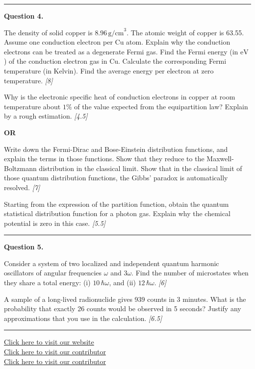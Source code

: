 \documentclass[11pt,a4paper]{article}
\newcommand{\pts}[1]{\hfill   \textit{[#1]}}
\begin{document}
\medskip\rule{\linewidth}{0.2pt}




\noindent   \textbf{Question 4.}

\begin{parts}
  \item The density of solid copper is $8.96\, \text{g/cm}^3$. The atomic weight of copper is 63.55. Assume one conduction electron per Cu atom. Explain why the conduction electrons can be treated as a degenerate Fermi gas. Find the Fermi energy (in $ \text{eV}$) of the conduction electron gas in Cu. Calculate the corresponding Fermi temperature (in Kelvin). Find the average energy per electron at zero temperature. \pts{8}
  \item Why is the electronic specific heat of conduction electrons in copper at room temperature about $1\%$ of the value expected from the equipartition law? Explain by a rough estimation. \pts{4.5}
\end{parts}
\hfill   \textbf{OR}

\begin{parts}
  \item Write down the Fermi-Dirac and Bose-Einstein distribution functions, and explain the terms in those functions. Show that they reduce to the Maxwell-Boltzmann distribution in the classical limit. Show that in the classical limit of those quantum distribution functions, the Gibbs’ paradox is automatically resolved. \pts{7}
  \item Starting from the expression of the partition function, obtain the quantum statistical distribution function for a photon gas. Explain why the chemical potential is zero in this case. \pts{5.5}
\end{parts}

\medskip\rule{\linewidth}{0.2pt}




\noindent   \textbf{Question 5.}

\begin{parts}
  \item Consider a system of two localized and independent quantum harmonic oscillators of angular frequencies $\omega$ and $3\omega$. Find the number of microstates when they share a total energy: (i) $10\,\hbar\omega$, and (ii) $12\,\hbar\omega$. \pts{6}
  \item A sample of a long-lived radionuclide gives 939 counts in 3 minutes. What is the probability that exactly 26 counts would be observed in 5 seconds? Justify any approximations that you use in the calculation. \pts{6.5}
\end{parts}

\vfill
\rule{\linewidth}{0.4pt}

\begin{center}\small
  \href{https://bhu-exam.vercel.app/}{Click here to visit our website}\\[4pt]
  \href{https://me-aryan.vercel.app/}{Click here to visit our contributor}\\[4pt]
  \href{https://quashan-me.vercel.app/}{Click here to visit our contributor}
\end{center}
\end{document}
